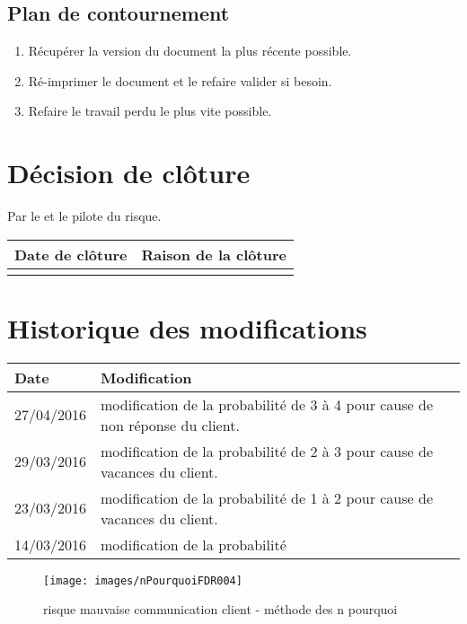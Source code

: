 \flushleft
\subsection*{Plan de contournement}

\begin{enumerate}
	\item Récupérer la version du document la plus récente possible.
	\item Ré-imprimer le document et le refaire valider si besoin.
	\item Refaire le travail perdu le plus vite possible.
\end{enumerate}

\section*{Décision de clôture}
Par le \CP{} et le pilote du risque.
\begin{table}[H]
\centering
	\begin{tabularx}{16.8cm}{|X|X|}
	\hline
	\rowcolor{gray!40} Date de clôture & Raison de la clôture \\
	\hline
	  & \\
	\hline
	\end{tabularx}
\end{table}

\section*{Historique des modifications}
\begin{table}[H]
\centering
	\begin{tabularx}{16.8cm}{|X|X|}
	\hline	
        \rowcolor{gray!40} Date & Modification \\
        
        \hline
	27/04/2016 & modification de la probabilité de 3 à 4 pour cause de non réponse du client. \\
        \hline
	29/03/2016 & modification de la probabilité de 2 à 3 pour cause de vacances du client. \\
	\hline
	23/03/2016 & modification de la probabilité de 1 à 2 pour cause de vacances du client. \\
	\hline
	14/03/2016 & modification de la probabilité\\
	\hline
	\end{tabularx}
\end{table}
\newpage

\begin{figure}
	\centering
	\texttt{[image: images/nPourquoiFDR004]}
	\caption{\label{risque mauvaise communication client}risque mauvaise communication client - méthode des n pourquoi}
\end{figure}
